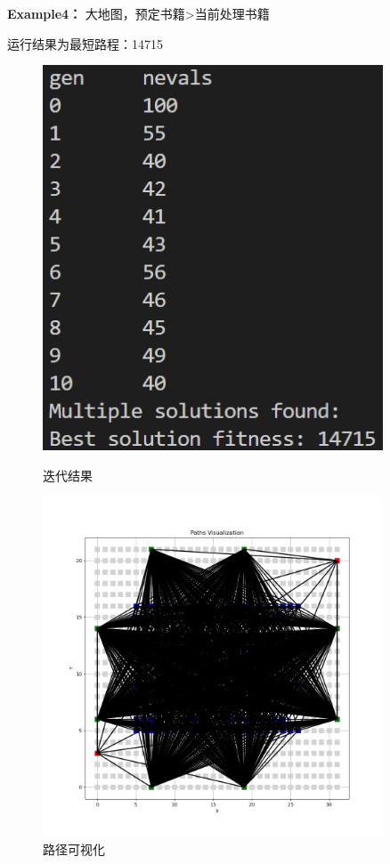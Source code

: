 \documentclass[withoutpreface,bwprint]{thesis-config}
\begin{document}
\par \textbf{Example4：} 大地图，预定书籍>当前处理书籍
\par 运行结果为最短路程：14715
    \begin{figure}[!htbp]
        \centering
        \begin{minipage}[b]{0.4\linewidth}
            \centering
            \includegraphics[width=0.9\textwidth]{figures/3.5.png}
            \caption{迭代结果}
        \end{minipage}%
        \begin{minipage}[b]{0.53\linewidth}
            \centering
            \includegraphics[width=0.9\textwidth]{figures/3.6.png}
            \caption{路径可视化}
        \end{minipage}%
    \end{figure}
\end{document}
